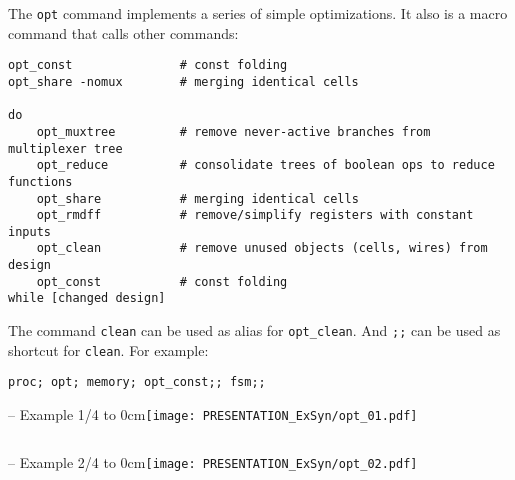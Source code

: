 \begin{frame}[fragile]{\subsecname}
The {\tt opt} command implements a series of simple optimizations. It also
is a macro command that calls other commands:

\begin{lstlisting}[xleftmargin=0.5cm, basicstyle=\ttfamily\fontsize{8pt}{10pt}\selectfont, language=ys]
opt_const               # const folding
opt_share -nomux        # merging identical cells

do
    opt_muxtree         # remove never-active branches from multiplexer tree
    opt_reduce          # consolidate trees of boolean ops to reduce functions
    opt_share           # merging identical cells
    opt_rmdff           # remove/simplify registers with constant inputs
    opt_clean           # remove unused objects (cells, wires) from design
    opt_const           # const folding
while [changed design]
\end{lstlisting}

The command {\tt clean} can be used as alias for {\tt opt\_clean}. And {\tt ;;}
can be used as shortcut for {\tt clean}. For example:

\begin{lstlisting}[xleftmargin=0.5cm, basicstyle=\ttfamily\fontsize{8pt}{10pt}\selectfont, language=ys]
proc; opt; memory; opt_const;; fsm;;
\end{lstlisting}
\end{frame}

\begin{frame}[t, fragile]{\subsecname{} -- Example 1/4}
\vbox to 0cm{\texttt{[image: PRESENTATION\_ExSyn/opt\_01.pdf]}\vss}
\vskip-1cm
\begin{columns}
\column[t]{5cm}

\column[t]{5cm}

\end{columns}
\end{frame}

\begin{frame}[t, fragile]{\subsecname{} -- Example 2/4}
\vbox to 0cm{\texttt{[image: PRESENTATION\_ExSyn/opt\_02.pdf]}\vss}
\vskip-1cm
\begin{columns}
\column[t]{5cm}

\column[t]{5cm}

\end{columns}
\end{frame}

